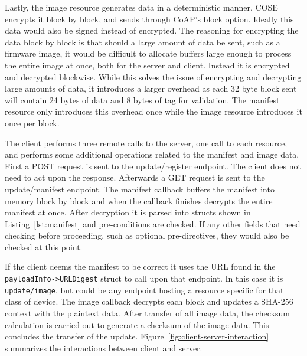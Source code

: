\documentclass[0-thesis.tex]{subfiles}
\begin{document}
Lastly, the image resource generates data in a deterministic manner, COSE encrypts it
block by block, and sends through CoAP's block option. Ideally this data would also be
signed instead of encrypted. The reasoning for encrypting the data block by block is that
should a large amount of data be sent, such as a firmware image, it would be difficult to
allocate buffers large enough to process the entire image at once, both for the server and
client. Instead it is encrypted and decrypted blockwise. While this solves the issue of
encrypting and decrypting large amounts of data, it introduces a larger overhead as each
32 byte block sent will contain 24 bytes of data and 8 bytes of tag for validation. The
manifest resource only introduces this overhead once while the image resource introduces
it once per block.

The client performs three remote calls to the server, one call to each resource, and
performs some additional operations related to the manifest and image data. First a POST
request is sent to the update/register endpoint. The client does not need to act upon the
response. Afterwards a GET request is sent to the update/manifest endpoint. The manifest
callback buffers the manifest into memory block by block and when the callback finishes
decrypts the entire manifest at once. After decryption it is parsed into structs shown in
Listing~\ref{lst:manifest} and pre-conditions are checked. If any other fields that need
checking before proceeding, such as optional pre-directives, they would also be checked at
this point. 

If the client deems the manifest to be correct it uses the URL found in the
\texttt{payloadInfo->URLDigest} struct to call upon that endpoint. In this case it is
\texttt{update/image}, but could be any endpoint hosting a resource specific for that
class of device. The image callback decrypts each block and updates a SHA-256 context with
the plaintext data. After transfer of all image data, the checksum calculation is carried
out to generate a checksum of the image data. This concludes the transfer of the update.
Figure~\ref{fig:client-server-interaction} summarizes the interactions between client and
server.
\end{document}
